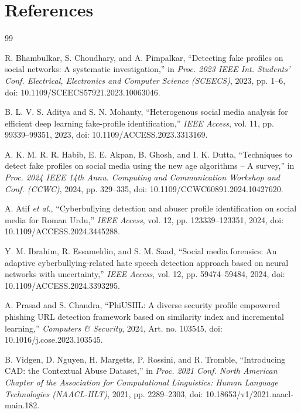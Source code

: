\chapter*{References}
\pagestyle{fancy}
\fancyhf{}
\renewcommand{\headrulewidth}{0pt}
\cfoot{\thepage}
\onehalfspacing
\begin{thebibliography}{99}

 R. Bhambulkar, S. Choudhary, and A. Pimpalkar, ``Detecting fake profiles on social networks: A systematic investigation,'' in \textit{Proc. 2023 IEEE Int. Students' Conf. Electrical, Electronics and Computer Science (SCEECS)}, 2023, pp. 1--6, doi: 10.1109/SCEECS57921.2023.10063046.

 B. L. V. S. Aditya and S. N. Mohanty, ``Heterogenous social media analysis for efficient deep learning fake-profile identification,'' \textit{IEEE Access}, vol. 11, pp. 99339--99351, 2023, doi: 10.1109/ACCESS.2023.3313169.

 A. K. M. R. R. Habib, E. E. Akpan, B. Ghosh, and I. K. Dutta, ``Techniques to detect fake profiles on social media using the new age algorithms -- A survey,'' in \textit{Proc. 2024 IEEE 14th Annu. Computing and Communication Workshop and Conf. (CCWC)}, 2024, pp. 329--335, doi: 10.1109/CCWC60891.2024.10427620.

 A. Atif \textit{et al.}, ``Cyberbullying detection and abuser profile identification on social media for Roman Urdu,'' \textit{IEEE Access}, vol. 12, pp. 123339--123351, 2024, doi: 10.1109/ACCESS.2024.3445288.

 Y. M. Ibrahim, R. Essameldin, and S. M. Saad, ``Social media forensics: An adaptive cyberbullying-related hate speech detection approach based on neural networks with uncertainty,'' \textit{IEEE Access}, vol. 12, pp. 59474--59484, 2024, doi: 10.1109/ACCESS.2024.3393295.

 A. Prasad and S. Chandra, ``PhiUSIIL: A diverse security profile empowered phishing URL detection framework based on similarity index and incremental learning,'' \textit{Computers \& Security}, 2024, Art. no. 103545, doi: 10.1016/j.cose.2023.103545.

 B. Vidgen, D. Nguyen, H. Margetts, P. Rossini, and R. Tromble, ``Introducing CAD: the Contextual Abuse Dataset,'' in \textit{Proc. 2021 Conf. North American Chapter of the Association for Computational Linguistics: Human Language Technologies (NAACL-HLT)}, 2021, pp. 2289--2303, doi: 10.18653/v1/2021.naacl-main.182.


\end{thebibliography}
